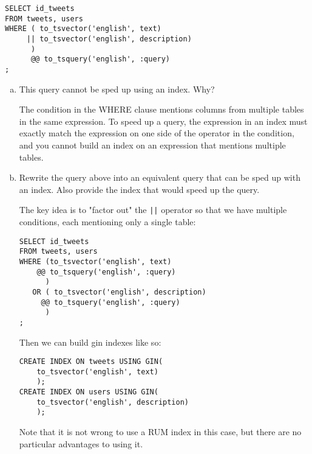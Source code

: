 \documentclass[12pt]{exam}
\theoremstyle{definition}
\begin{document}
\begin{questions}
{\begin{lstlisting}
SELECT id_tweets
FROM tweets, users
WHERE ( to_tsvector('english', text)
     || to_tsvector('english', description)
      ) 
      @@ to_tsquery('english', :query)
;
\end{lstlisting}
}

\begin{enumerate}[a)]
    \item This query cannot be sped up using an index.  Why?

        \begin{solution}
            The condition in the WHERE clause mentions columns from multiple tables in the same expression.
            To speed up a query, the expression in an index must exactly match the expression on one side of the operator in the condition,
            and you cannot build an index on an expression that mentions multiple tables.
        \end{solution}

    \item Rewrite the query above into an equivalent query that can be sped up with an index.  Also provide the index that would speed up the query.

        \begin{solution}
            The key idea is to "factor out" the \lstinline{||} operator so that we have multiple conditions, each mentioning only a single table:
\begin{lstlisting}
SELECT id_tweets
FROM tweets, users
WHERE (to_tsvector('english', text) 
    @@ to_tsquery('english', :query)
      )
   OR ( to_tsvector('english', description)
     @@ to_tsquery('english', :query)
      )
;
\end{lstlisting}
Then we can build gin indexes like so:
\begin{lstlisting}
CREATE INDEX ON tweets USING GIN(
    to_tsvector('english', text)
    );
CREATE INDEX ON users USING GIN(
    to_tsvector('english', description)
    );
\end{lstlisting}
Note that it is not wrong to use a RUM index in this case, but there are no particular advantages to using it.
        \end{solution}
\end{enumerate}

\end{questions}
\end{document}
